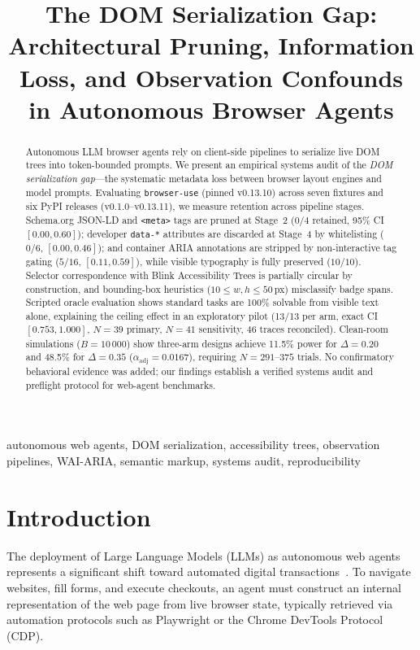 \documentclass[conference]{IEEEtran}
\title{The DOM Serialization Gap: Architectural Pruning, Information Loss, and Observation Confounds in Autonomous Browser Agents}
\author{
  \IEEEauthorblockN{Anonymous Authors}
  \IEEEauthorblockA{\textit{Under Double-Blind Peer Review}}
}
\begin{document}
\maketitle

\begin{abstract}
Autonomous LLM browser agents rely on client-side pipelines to serialize live DOM trees into token-bounded prompts. We present an empirical systems audit of the \emph{DOM serialization gap}---the systematic metadata loss between browser layout engines and model prompts. Evaluating \texttt{browser-use} (pinned v0.13.10) across seven fixtures and six PyPI releases (v0.1.0--v0.13.11), we measure retention across pipeline stages. Schema.org JSON-LD and \texttt{<meta>} tags are pruned at Stage~2 ($0/4$ retained, 95\% CI $[0.00, 0.60]$); developer \texttt{data-*} attributes are discarded at Stage~4 by whitelisting ($0/6$, $[0.00, 0.46]$); and container ARIA annotations are stripped by non-interactive tag gating ($5/16$, $[0.11, 0.59]$), while visible typography is fully preserved ($10/10$). Selector correspondence with Blink Accessibility Trees is partially circular by construction, and bounding-box heuristics ($10 \le w, h \le 50$\,px) misclassify badge spans. Scripted oracle evaluation shows standard tasks are 100\% solvable from visible text alone, explaining the ceiling effect in an exploratory pilot (13/13 per arm, exact CI $[0.753, 1.000]$, $N=39$ primary, $N=41$ sensitivity, 46 traces reconciled). Clean-room simulations ($B=10\,000$) show three-arm designs achieve 11.5\% power for $\Delta=0.20$ and 48.5\% for $\Delta=0.35$ ($\alpha_{\mathrm{adj}}=0.0167$), requiring $N=291\text{--}375$ trials. No confirmatory behavioral evidence was added; our findings establish a verified systems audit and preflight protocol for web-agent benchmarks.
\end{abstract}

\begin{IEEEkeywords}
autonomous web agents, DOM serialization, accessibility trees, observation pipelines, WAI-ARIA, semantic markup, systems audit, reproducibility
\end{IEEEkeywords}

\section{Introduction}
\label{sec:intro}

The deployment of Large Language Models (LLMs) as autonomous web agents represents a significant shift toward automated digital transactions~\cite{zhou2024webarena, deng2023mind2web, drouin2024workarena, workarenapp2024, osworld2024}. To navigate websites, fill forms, and execute checkouts, an agent must construct an internal representation of the web page from live browser state, typically retrieved via automation protocols such as Playwright or the Chrome DevTools Protocol (CDP).
\end{document}
